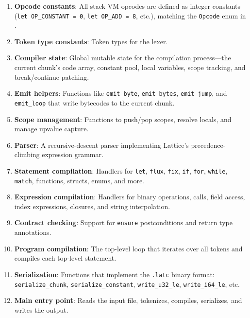 \begin{enumerate}
  \item \textbf{Opcode constants}: All stack VM opcodes are defined as integer constants (\lstinline|let OP_CONSTANT = 0|, \lstinline|let OP_ADD = 8|, etc.), matching the \lstinline|Opcode| enum in .
  \item \textbf{Token type constants}: Token types for the lexer.
  \item \textbf{Compiler state}: Global mutable state for the compilation process---the current chunk's code array, constant pool, local variables, scope tracking, and break/continue patching.
  \item \textbf{Emit helpers}: Functions like \lstinline|emit_byte|, \lstinline|emit_bytes|, \lstinline|emit_jump|, and \lstinline|emit_loop| that write bytecodes to the current chunk.
  \item \textbf{Scope management}: Functions to push/pop scopes, resolve locals, and manage upvalue capture.
  \item \textbf{Parser}: A recursive-descent parser implementing Lattice's precedence-climbing expression grammar.
  \item \textbf{Statement compilation}: Handlers for \lstinline|let|, \lstinline|flux|, \lstinline|fix|, \lstinline|if|, \lstinline|for|, \lstinline|while|, \lstinline|match|, functions, structs, enums, and more.
  \item \textbf{Expression compilation}: Handlers for binary operations, calls, field access, index expressions, closures, and string interpolation.
  \item \textbf{Contract checking}: Support for \lstinline|ensure| postconditions and return type annotations.
  \item \textbf{Program compilation}: The top-level loop that iterates over all tokens and compiles each top-level statement.
  \item \textbf{Serialization}: Functions that implement the \lstinline|.latc| binary format: \lstinline|serialize_chunk|, \lstinline|serialize_constant|, \lstinline|write_u32_le|, \lstinline|write_i64_le|, etc.
  \item \textbf{Main entry point}: Reads the input file, tokenizes, compiles, serializes, and writes the output.
\end{enumerate}

